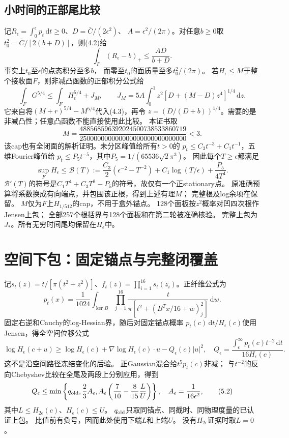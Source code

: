 \documentclass[UTF8,fontset=fandol,zihao=-4,a4paper]{ctexart}
\newcommand{\1}{\mathbf 1}
\newcommand{\dd}{\,\mathrm d}
\begin{document}
\subsection{小时间的正部尾比较}
记$R_\epsilon=\int_0^\epsilon p_t\dd t\ge0$、$D=\bar C/(2\epsilon^2)$、
$A=\epsilon^2/(2\pi)$。对任意$b\ge0$取
$t_0^2=\bar C/[2(b+D)]$，则(4.2)给
\[
 \int_F(R_\epsilon-b)_+\le\frac{AD}{b+D}.                 \tag{4.3}
\]
事实上$t_0$至$\epsilon$的点态积分至多$b$，
而零至$t_0$的面质量至多$t_0^2/(2\pi)$。
若$H_\epsilon\le M$于整个接收面$F$，则非减凸函数的正部积分公式给
\[
 \int_FG^{5/4}\le\int_FH_\epsilon^{5/4}+J_M,\qquad
 J_M=5A\int_0^1 z^2[D+(M-D)z^4]^{1/4}\dd z.             \tag{4.4}
\]
它来自将$(M+r)^{5/4}-M^{5/4}$代入(4.3)，再令
$z=(D/(D+b))^{1/4}$。需要的是非减凸性；任意凸函数不能直接使用此比较。
本证书取
\[
 M=\frac{488568596392024500738533860719}{250000000000000000000000000000}<3.
\]
该cap也有全闭面的解析证明。未分区峰值给所有$t>0$的
$p_t\le C_3t^{-3}+C_1t^{-1}$，五维Fourier峰值给
$p_t\le P_5t^{-5}$，其中$P_5=1/(65536\sqrt2\pi^3)$。
因此每个$T\ge\epsilon$都满足
\[
 \sup_F H_\epsilon\le\mathcal B(T):=
 \frac{C_3}{2}(\epsilon^{-2}-T^{-2})+
 C_1\log(T/\epsilon)+\frac{P_5}{4T^4}.
\]
$\mathcal B'(T)$的符号是$C_1T^4+C_3T^2-P_5$的符号，故仅有一个正stationary点。
原准确预算将系数换成有向端点，并包围该正根，得到上述有理$M$；
完整根及log余项在保留。
$M$仅为$F$上$H_{1/512}$的cap，不用于盒外锚点。
128个面板按$z^2$概率对凹四次根作Jensen上包；
全部257个根括界与128个面板和在第二轮被准确核验。
完整上包为$J_*$。所有无穷时间尾均保留在$H_\epsilon$中。

\section{空间下包：固定锚点与完整闭覆盖}
记$s_t(z)=t/[\pi(t^2+z^2)]$、$f_t(z)=\prod_{i=1}^{16}s_t(z_i)$。正纤维公式为
\[
 p_t(x)=\frac1{1024}\int_{\ker B}
 \prod_{j=1}^{16}\frac{t}{\pi[t^2+(B^Tx/16+w)_j^2]}\dd w.
\]
固定右逆和Cauchy的log-Hessian界，随后对固定锚点概率
$p_t(c)\dd t/H_\epsilon(c)$使用Jensen，得全空间位移公式
\[
 \log H_\epsilon(c+u)\ge\log H_\epsilon(c)
 +\nabla\log H_\epsilon(c)\cdot u-Q_\epsilon(c)|u|^2,\quad
 Q_\epsilon=\frac{\int_\epsilon^\infty p_t(c)t^{-2}\dd t}{16H_\epsilon(c)}.
 \tag{5.1}
\]
这不是沿空间路径冻结变化的后验。
正Gaussian混合给$t^5p_t(c)$非减；
与$t^{-2}$的反向Chebyshev比较在全尾及两段上分别应用，得到
\[
 Q_\epsilon\le\min\left\{q_{\rm old},\frac23A_\epsilon,
 A_\epsilon\left(\frac7{10}-\frac8{15}\frac{L}{U}\right)\right\},
 \quad A_\epsilon=\frac1{16\epsilon^2},                 \tag{5.2}
\]
其中$L\le H_{2\epsilon}(c)$、$H_\epsilon(c)\le U$。
$q_{\rm old}$只取同锚点、同截时、同物理度量的已认证上包。
比值前有负号，因而此处使用下端$L$和上端$U$。
没有$H_{2\epsilon}$证据时取$L=0$。
\end{document}
